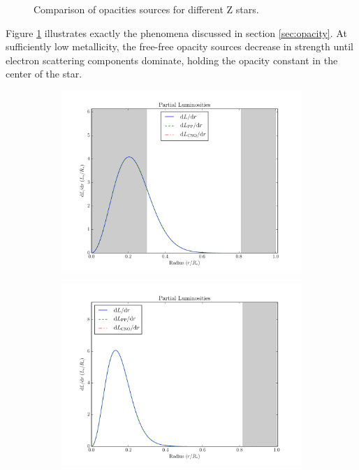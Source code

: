 \documentclass[11pt]{article}
\begin{document}
\begin{center}
\begin{figure}[H]
\begin{subfigure}{.5\textwidth}
            \end{subfigure}
            \caption{Comparison of opacities sources for different Z stars.}
            \label{fig:opacitycomparisonZ}
        \end{figure}
    \end{center}
    Figure \ref{fig:opacitycomparisonZ} illustrates exactly the phenomena discussed in section \ref{sec:opacity}. At sufficiently low metallicity, the free-free opacity sources decrease in strength until electron scattering components dominate, holding the opacity constant in the center of the star.
    \begin{center}
        \begin{figure}[H]
            \begin{subfigure}{.5\textwidth}
                \centering
                \includegraphics[width=1.1\textwidth]{figures/lowZ/partial_lumin.pdf}
            \end{subfigure}
            \begin{subfigure}{.5\textwidth}
                \centering
                \includegraphics[width=1.1\textwidth]{figures/highZ/partial_lumin.pdf}

\end{subfigure}
\end{figure}
\end{center}
\end{document}
